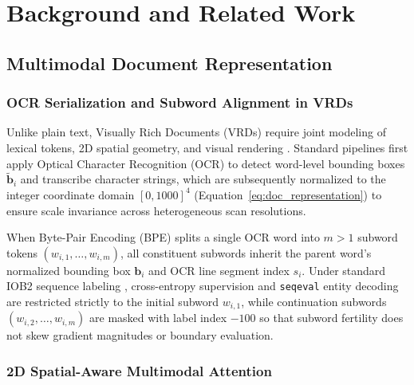 \chapter{Background and Related Work}
\label{chap:related_works}

\section{Multimodal Document Representation}
\label{sec:foundational_knowledge}

\subsection{OCR Serialization and Subword Alignment in VRDs}
\label{subsec:vrd_ocr}

Unlike plain text, Visually Rich Documents (VRDs) require joint modeling of lexical tokens, 2D spatial geometry, and visual rendering \cite{cui2021documentai}. Standard pipelines first apply Optical Character Recognition (OCR) to detect word-level bounding boxes $\tilde{\mathbf{b}}_i$ and transcribe character strings, which are subsequently normalized to the integer coordinate domain $[0, 1000]^4$ (Equation~\ref{eq:doc_representation}) to ensure scale invariance across heterogeneous scan resolutions.

When Byte-Pair Encoding (BPE) \cite{sennrich2016neural,liu2019roberta} splits a single OCR word into $m > 1$ subword tokens $(w_{i,1}, \dots, w_{i,m})$, all constituent subwords inherit the parent word's normalized bounding box $\mathbf{b}_i$ and OCR line segment index $s_i$. Under standard IOB2 sequence labeling \cite{ramshaw1995text}, cross-entropy supervision and \texttt{seqeval} entity decoding are restricted strictly to the initial subword $w_{i,1}$, while continuation subwords $(w_{i,2}, \dots, w_{i,m})$ are masked with label index $-100$ so that subword fertility does not skew gradient magnitudes or boundary evaluation.

\subsection{2D Spatial-Aware Multimodal Attention}
\label{subsec:transformer_attention}

